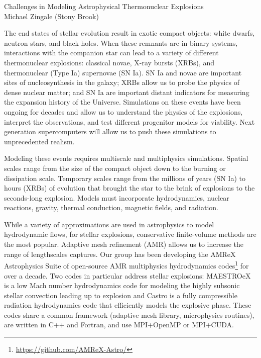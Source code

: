 \documentclass[11pt]{article}
\begin{document}
\begin{center}
{\large Challenges in Modeling Astrophysical Thermonuclear Explosions} \\[0.25em]
Michael Zingale (Stony Brook)
\end{center}

The end states of stellar evolution result in exotic compact objects:
white dwarfs, neutron stars, and black holes.  When these remnants are
in binary systems, interactions with the companion star can lead to a
variety of different thermonuclear explosions: classical novae, X-ray
bursts (XRBs), and thermonuclear (Type Ia) supernovae (SN Ia).  SN Ia
and novae are important sites of nucleosynthesis in the galaxy; XRBs
allow us to probe the physics of dense nuclear matter; and SN Ia are
important distant indicators for measuring the expansion history of
the Universe.  Simulations on these events have been ongoing for
decades and allow us to understand the physics of the explosions,
interpret the observations, and test different progenitor models for
viability.  Next generation supercomputers will allow us to push these
simulations to unprecedented realism.

Modeling these events requires multiscale and multiphysics simulations.
Spatial scales range from the size of the compact object
down to the burning or dissipation scale.  Temporary scales range from
the millions of years (SN Ia) to hours (XRBs) of evolution that
brought the star to the brink of explosions to the seconds-long
explosion.  Models must incorporate hydrodynamics, nuclear reactions,
gravity, thermal conduction, magnetic fields, and radiation.

While a variety of approximations are used in astrophysics to model
hydrodynamic flows, for stellar explosions, conservative finite-volume
methods are the most popular.  Adaptive mesh refinement (AMR) allows
us to increase the range of lengthscales captures.  Our group has been
developing the AMReX Astrophysics Suite of open-source AMR
multiphysics hydrodynamics
codes\footnote{\url{https://github.com/AMReX-Astro/}} for over a
decade.  Two codes in particular address stellar explosions: MAESTROeX
is a low Mach number hydrodynamics code for modeling the highly
subsonic stellar convection leading up to explosion and Castro is a
fully compressible radiation hydrodynamics code that efficiently
models the explosive phase.  These codes share a common framework
(adaptive mesh library, microphysics routines), are written in C++ and Fortran,
and use MPI+OpenMP or MPI+CUDA.
\end{document}
